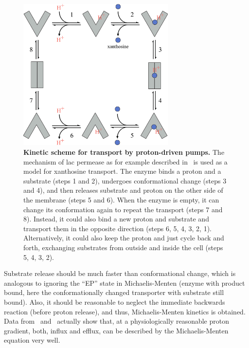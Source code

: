 \documentclass[10pt,letterpaper]{article}
\begin{document}
\begin{figure}
	\centering
	\includegraphics[width=0.7\textwidth]{FigSI2.pdf}
	\caption{{\bf Kinetic scheme for transport by proton-driven pumps.}
		The mechanism of lac permease as for example described
		in~\cite{Kaback2015} is used as a model for xanthosine transport.
		The enzyme binds a proton and a substrate (steps 1 and 2), undergoes
		conformational change (steps 3 and 4), and then releases substrate
		and proton on the other side of the membrane (steps 5 and 6). When
		the enzyme is empty, it can change its conformation again to repeat
		the transport (steps 7 and 8). Instead, it could also bind a new
		proton and substrate and transport them in the opposite direction
		(steps 6, 5, 4, 3, 2, 1). Alternatively, it could also keep the
		proton and just cycle back and forth, exchanging substrates from
		outside and inside the cell (steps 5, 4, 3, 2).}
	\label{figS2:permease}
\end{figure}

Substrate release should be much faster than conformational change, which is
analogous to ignoring the ``EP'' state in Michaelis-Menten (enzyme with
product bound, here the conformationally changed transporter with substrate
still bound). Also, it should be reasonable to neglect the immediate
backwards reaction (before proton release), and thus, Michaelis-Menten
kinetics is obtained. Data from~\cite{Kaczorowski1979}
and~\cite{Viitanen1984} actually show that, at a physiologically reasonable
proton gradient, both, influx and efflux, can be described by the
Michaelis-Menten equation very well.
\end{document}
